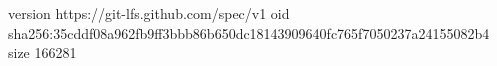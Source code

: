 version https://git-lfs.github.com/spec/v1
oid sha256:35cddf08a962fb9ff3bbb86b650dc18143909640fc765f7050237a24155082b4
size 166281
